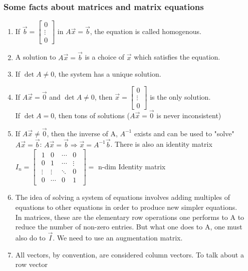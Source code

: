\subsubsection*{Some facts about matrices and matrix equations}
\begin{enumerate}[label=\protect\circled{\arabic*}]
	\item If $\vec{b} = \begin{bmatrix}
		0\\ \vdots \\ 0 
	\end{bmatrix}$ in $A\vec{x} = \vec{b}$, the equation is called homogenous.
	\item A solution to $A\vec{x} = \vec{b}$ is a choice of $\vec{x}$ which satisfies the equation.
	\item If $\det A \neq 0$, the system has a unique solution.
	\item If $A\vec{x} = \vec{0}$ and $\det A \neq 0$, then $\vec{x} = \begin{bmatrix}
		0\\ \vdots \\ 0 
	\end{bmatrix}$ is the only solution.\\
	If $\det A = 0$, then tons of solutions ($A\vec{x} = \vec{0}$ is never inconsistent)
	\item If $A\vec{x} \neq \vec{0}$, then the inverse of A, $A^{-1}$ exists and can be used to "solve" $A\vec{x} = \vec{b}$: $A\vec{x} = \vec{b} \Rightarrow \vec{x} = A^{-1}\vec{b}$. There is also an identity matrix $I_n  = \begin{bmatrix} \begin{smallmatrix}
		1 & 0 & \cdots & 0\\
		0 & 1 & \cdots & \vdots\\
		\vdots & \vdots & \ddots & 0\\
		0 & \cdots & 0 & 1
		\end{smallmatrix}
	\end{bmatrix} =$ n-dim Identity matrix
	\item The idea of solving a system of equations involves adding multiples of equations to other equations in order to produce new simpler equations.\\
	In matrices, these are the elementary row operations one performs to A to reduce the number of non-zero entries. But what one does to A, one must also do to $\vec{I}$. We need to use an augmentation matrix.
	\item All vectors, by convention, are considered column vectors. To talk about a row vector

\end{enumerate}
